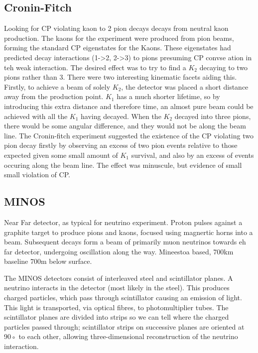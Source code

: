 \documentclass[]{article}
\begin{document}
	\subsection{Cronin-Fitch}
	
	Looking for CP violating kaon to 2 pion decays decays from neutral kaon production. The kaons for the experiment were produced from pion beams, forming the standard CP eigenstates for the Kaons. These eigenstates had predicted decay interactions (1->2, 2->3) to pions presuming CP convse ation in teh weak interaction. The desired effect was to try to find a $K_2$ decaying to two pions rather than 3. There were two interesting kinematic facets aiding this. Firstly, to achieve a beam of solely $K_2$, the detector was placed a short distance away from the production point. $K_1$ has a much shorter lifetime, so by introducing this extra distance and therefore time, an almost pure beam could be achieved with all the $K_1$ having decayed. When the $K_2$ decayed into three pions, there would be some angular difference, and they would not be along the beam line. The Cronin-fitch experiment suggested the existence of the CP violating two pion decay firstly by observing an excess of two pion events relative to those expected given some small amount of $K_1$ survival, and also by an excess of events occuring along the beam line. The effect was minuscule, but evidence of small small violation of CP. 
	
	\subsection{MINOS}
	
	Near Far detector, as typical for neutrino experiment. Proton pulses against a graphite target to produce pions and kaons, focused using magnertic horns into a beam. Subsequent decays form a beam of primarily muon neutrinos towards eh far detector, undergoing oscillation along the way. Mineestoa based, 700km baseline 700m below surface. 
	
	The MINOS detectors consist of interleaved steel and scintillator planes. A
	neutrino interacts in the detector (most likely in the steel). This produces
	charged particles, which pass through scintillator causing an emission of light.
	This light is transported, via optical fibres, to photomultiplier tubes. The
	scintillator planes are divided into strips so we can tell where the charged particles
	passed through; scintillator strips on successive planes are oriented at
	90◦
	to each other, allowing three-dimensional reconstruction of the neutrino
	interaction.
	
\end{document}
